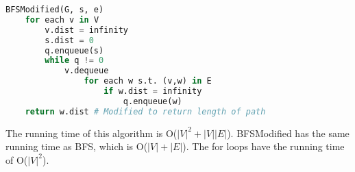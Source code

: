 \documentclass[14pt]{extarticle}
\begin{document}
\begin{lstlisting}[language=Python]
BFSModified(G, s, e)
	for each v in V
		v.dist = infinity
		s.dist = 0
		q.enqueue(s)
		while q != 0
			v.dequeue
				for each w s.t. (v,w) in E
					if w.dist = infinity
						q.enqueue(w)
	return w.dist # Modified to return length of path
\end{lstlisting}

The running time of this algorithm is O($|V|^2 + |V||E|$).
BFSModified has the same running time as BFS, which is O($|V|+|E|$).
The for loops have the running time of O($|V|^2$).
\end{document}
